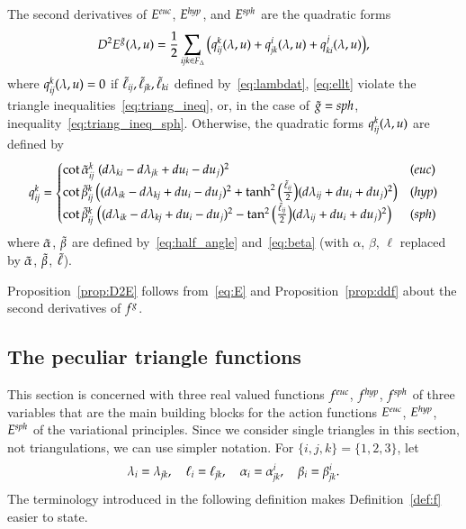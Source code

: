 \documentclass[Thesis]{subfiles}
\begin{document}
\begin{proposition}
  \label{prop:D2E}
  The second derivatives of $E^{\euc}$, $E^{\mathit{hyp}}$, and $E^{\mathit{sph}}$ are the
  quadratic forms
  \begin{equation*}
    D^{2}E^{\tilde{g}}(\lambda,u)=\frac{1}{2}\sum_{{\it ijk}\in F_{\Delta}}
    \big(
    q_{\it ij}^{k}(\lambda,u) + q_{\it jk}^{i}(\lambda,u) + q_{\it
      ki}^{j}(\lambda,u)
    \big),
  \end{equation*}
  where $q_{\it ij}^{k}(\lambda,u)=0$ if\/ $\tilde{\ell}_{\it ij}, \tilde{\ell}_{\it
    jk}, \tilde{\ell}_{\it ki}$ defined by~\eqref{eq:lambdat},
  \eqref{eq:ellt} violate the triangle
  inequalities~\eqref{eq:triang_ineq}, or, in the case of $\tilde{g}=\mathit{sph}$,
  inequality~\eqref{eq:triang_ineq_sph}. Otherwise, the quadratic forms
  $q_{\it ij}^{k}(\lambda,u)$ are defined by
  \begin{equation*}
    q_{\it ij}^{k} = 
    \begin{cases}
      \cot\alphat_{\it ij}^k\;(d\lambda_{\it ki}-d\lambda_{\it jk}
      + du_i - du_j)^2
      &
      (\euc)
      \\
      \cot\betat^k_{\it ij}\,
      \big(
      (d\lambda_{\it ik}-d\lambda_{\it kj} +  du_i-du_j)^2
      +\tanh^2
      \big(
      \tfrac{\tilde \ell_{\it ij}}{2}
      \big)
      (d\lambda_{\it ij} +du_i+du_j)^2
      \big)
      &
      (\hyp)
      \\
      \cot\betat^k_{\it ij}\;
      \big(
      (d\lambda_{\it ik}-d\lambda_{\it kj} + du_i-du_j)^2
      -\tan^2
      \big(
      \tfrac{\tilde \ell_{\it ij}}{2}
      \big)
      (d\lambda_{\it ij} +du_i+du_j)^2
      \big)
      &
      (\sph)
    \end{cases}
  \end{equation*}
  where $\tilde{\alpha}$, $\tilde{\beta}$ are defined by~\eqref{eq:half_angle}
  and~\eqref{eq:beta} (with $\alpha$, $\beta$, $\ell$ replaced by
  $\tilde{\alpha}$, $\tilde{\beta}$, $\tilde{\ell}$). 
\end{proposition}

Proposition~\ref{prop:D2E} follows from~\eqref{eq:E} and
Proposition~\ref{prop:ddf} about the second derivatives of $f^{g}$.

\subsection{The peculiar triangle functions}
\label{sec:f}

This section is concerned with three real valued functions $f^{\euc}$,
$f^{\mathit{hyp}}$, $f^{\mathit{sph}}$ of three variables that are the main building
blocks for the action functions $E^{\euc}$, $E^{\mathit{hyp}}$, $E^{\mathit{sph}}$ of
the variational principles. 
Since we consider single triangles in this section, not
triangulations, we can use simpler notation. For
$\{i,j,k\}=\{1,2,3\}$, let
\begin{equation*}
  \lambda_{i}=\lambda_{\it jk},\quad 
  \ell_{i}=\ell_{\it jk},\quad
  \alpha_{i}=\alpha_{\it jk}^{i},\quad 
  \beta_{i}=\beta_{\it jk}^{i}.
\end{equation*}
The terminology introduced in the following definition makes
Definition~\ref{def:f} easier to state.
\end{document}
